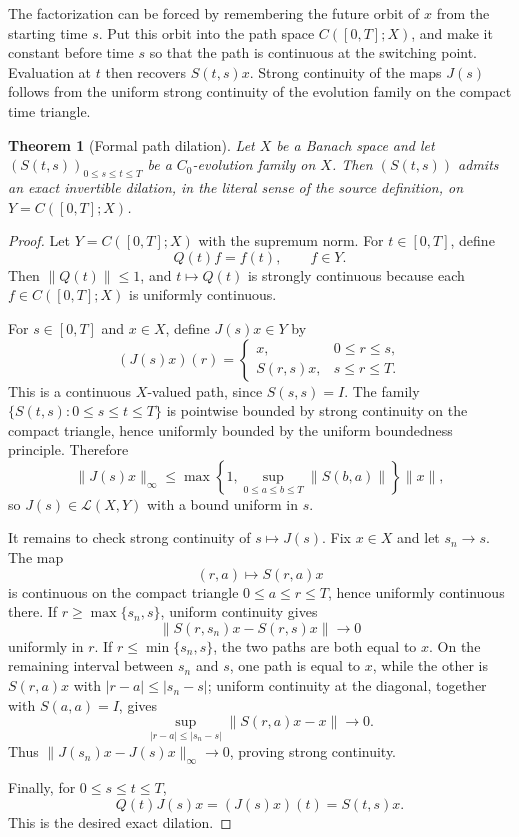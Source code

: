 \documentclass[11pt]{article}
\newtheorem{theorem}{Theorem}
\newcommand{\calL}{\mathcal L}
\begin{document}
The factorization can be forced by remembering the future orbit of \(x\) from
the starting time \(s\). Put this orbit into the path space \(C([0,T];X)\), and
make it constant before time \(s\) so that the path is continuous at the
switching point. Evaluation at \(t\) then recovers \(S(t,s)x\). Strong
continuity of the maps \(J(s)\) follows from the uniform strong continuity of
the evolution family on the compact time triangle.

\begin{theorem}[Formal path dilation]\label{thm:path}
Let \(X\) be a Banach space and let
\((S(t,s))_{0\leq s\leq t\leq T}\) be a \(C_0\)-evolution family on \(X\).
Then \((S(t,s))\) admits an exact invertible dilation, in the literal sense of
the source definition, on \(Y=C([0,T];X)\).
\end{theorem}

\begin{proof}
Let \(Y=C([0,T];X)\) with the supremum norm. For \(t\in[0,T]\), define
\[
  Q(t)f=f(t),\qquad f\in Y.
\]
Then \(\|Q(t)\|\leq 1\), and \(t\mapsto Q(t)\) is strongly continuous because
each \(f\in C([0,T];X)\) is uniformly continuous.

For \(s\in[0,T]\) and \(x\in X\), define \(J(s)x\in Y\) by
\[
  (J(s)x)(r)=
  \begin{cases}
    x, & 0\leq r\leq s,\\
    S(r,s)x, & s\leq r\leq T.
  \end{cases}
\]
This is a continuous \(X\)-valued path, since \(S(s,s)=I\). The family
\(\{S(t,s):0\leq s\leq t\leq T\}\) is pointwise bounded by strong continuity
on the compact triangle, hence uniformly bounded by the uniform boundedness
principle. Therefore
\[
  \|J(s)x\|_{\infty}\leq
  \max\left\{1,\sup_{0\leq a\leq b\leq T}\|S(b,a)\|\right\}\|x\|,
\]
so \(J(s)\in\calL(X,Y)\) with a bound uniform in \(s\).

It remains to check strong continuity of \(s\mapsto J(s)\). Fix \(x\in X\) and
let \(s_n\to s\). The map
\[
  (r,a)\mapsto S(r,a)x
\]
is continuous on the compact triangle \(0\leq a\leq r\leq T\), hence uniformly
continuous there. If \(r\geq \max\{s_n,s\}\), uniform continuity gives
\[
  \|S(r,s_n)x-S(r,s)x\|\to 0
\]
uniformly in \(r\). If \(r\leq \min\{s_n,s\}\), the two paths are both equal
to \(x\). On the remaining interval between \(s_n\) and \(s\), one path is
equal to \(x\), while the other is \(S(r,a)x\) with \(|r-a|\leq |s_n-s|\);
uniform continuity at the diagonal, together with \(S(a,a)=I\), gives
\[
  \sup_{|r-a|\leq |s_n-s|}\|S(r,a)x-x\|\to 0.
\]
Thus \(\|J(s_n)x-J(s)x\|_{\infty}\to0\), proving strong continuity.

Finally, for \(0\leq s\leq t\leq T\),
\[
  Q(t)J(s)x=(J(s)x)(t)=S(t,s)x.
\]
This is the desired exact dilation.
\end{proof}
\end{document}
